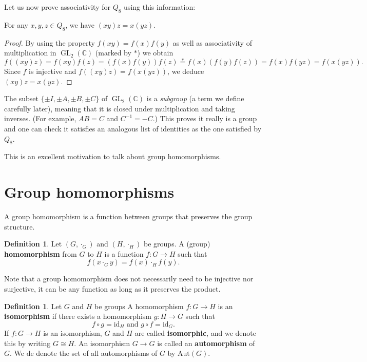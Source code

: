 \documentclass[12pt]{report}
\numberwithin{equation}{section}
\numberwithin{theorem}{chapter}
\theoremstyle{definition}
\newtheorem{definition}[theorem]{Definition}
\newtheorem*{basic properties}{Basic Properties}
\newtheorem*{Important Remark}{Important Remark}
\newcommand{\df}[1]{{\bf #1}\index{#1}}
\DeclareMathOperator{\GL}{GL}
\newcommand{\C}{\mathbb{C}}
\begin{document}
Let us now prove associativity for $Q_8$ using this information:
\smallskip

 For any $x,y,z\in Q_8$, we have $(xy)z=x(yz)$.
\begin{proof}
By using the property $f(xy)=f(x)f(y)$ as well as associativity of multiplication in $\GL_2(\C)$ (marked by $*$) we obtain
$$f((xy)z)=f(xy)f(z)=\left(f(x)f(y)\right)f(z)\stackrel{*}{=}f(x)\left(f(y)f(z)\right)=f(x)f(yz)=f(x(yz)).$$
Since $f$ is injective and $f((xy)z)=f(x(yz))$, we deduce  $(xy)z=x(yz)$.
\end{proof}


The subset $\{\pm I, \pm A, \pm B, \pm C\}$ of $\GL_2(\C)$ is a {\em subgroup} (a term we
define carefully later), meaning that it is closed under multiplication and taking inverses. (For example, $AB= C$ and $C^{-1} = -C$.) This proves it really is a group
and one can check it satisfies an analogous  list of identities as the one satisfied by $Q_8$.  



\vspace{1em}


This is an excellent motivation to talk about group homomorphisms.




\section{Group homomorphisms}



A group homomorphism is a function between groups that preserves the group structure.

\begin{definition}
Let $(G, \cdot_G)$ and $(H, \cdot_H)$ be groups.
A (group) {\bf homomorphism} from $G$ to $H$ is a function $f: G \to H$ such that 
$$f(x \cdot_G y) = f(x) \cdot_H f(y).$$
\end{definition}

Note that a group homomorphism does not necessarily need to be injective nor surjective, it can be any function as long as it preserves the product.

\begin{definition}\label{def:gpiso}
Let $G$ and $H$ be groups A homomorphism $f\!: G \to H$ is an \df{isomorphism} if there exists a homomorphism $g: H \to G$ such that 
$$f \circ g = \mathrm{id}_H \textrm{ and } g \circ f = \mathrm{id}_G.$$
If $f:G\to H$ is an isomorphism, $G$ and $H$ are called {\bf isomorphic}, and we denote this by writing $G\cong H$. An isomorphism $G \longrightarrow G$ is called an \df{automorphism} of $G$. We de denote the set of all automorphisms of $G$ by $\mathrm{Aut}(G)$.
\end{definition}
 
\end{document}
